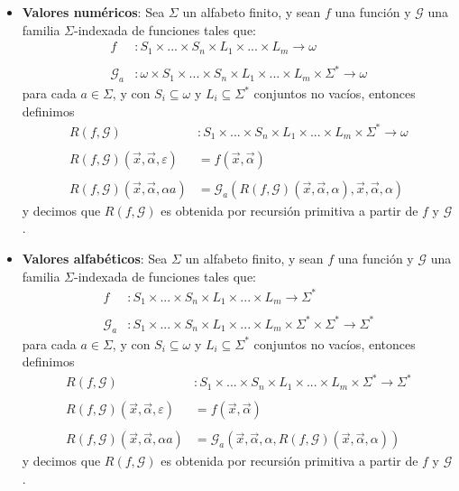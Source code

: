 \documentclass[
]{article}
\providecommand{\tightlist}{%
  \setlength{\itemsep}{0pt}\setlength{\parskip}{0pt}}
\begin{document}
\begin{enumerate}
  \begin{itemize}
  \tightlist
  \item
    \textbf{Valores numéricos}: Sea \(\Sigma\) un alfabeto finito, y
    sean \(f\) una función y \(\mathcal{G}\) una familia
    \(\Sigma\)-indexada de funciones tales que:
    \[\begin{aligned}f&:S_1\times ...\times S_n\times L_1\times ...\times L_m\to\omega\\ \\ \mathcal{G}_a&:\omega\times S_1\times ...\times S_n\times L_1\times ...\times L_m\times\Sigma^*\to\omega\end{aligned}\]
    para cada \(a\in\Sigma\), y con \(S_i\subseteq\omega\) y
    \(L_i\subseteq\Sigma^*\) conjuntos no vacíos, entonces definimos
    \[\begin{aligned} R(f,\mathcal{G})&:S_1\times ...\times S_n\times L_1\times ...\times L_m\times\Sigma^*\to\omega\\ \\ R(f,\mathcal{G})(\vec{x},\vec{\alpha},\varepsilon)&=f(\vec{x},\vec{\alpha})\\ \\ R(f,\mathcal{G})(\vec{x},\vec{\alpha},\alpha a)&=\mathcal{G}_a(R(f,\mathcal{G})(\vec{x},\vec{\alpha},\alpha),\vec{x},\vec{\alpha},\alpha) \end{aligned}\]
    y decimos que \(R(f,\mathcal{G})\) es obtenida por recursión
    primitiva a partir de \(f\) y \(\mathcal{G}\).
  \item
    \textbf{Valores alfabéticos}: Sea \(\Sigma\) un alfabeto finito, y
    sean \(f\) una función y \(\mathcal{G}\) una familia
    \(\Sigma\)-indexada de funciones tales que:
    \[\begin{aligned}f&:S_1\times ...\times S_n\times L_1\times ...\times L_m\to\Sigma^*\\ \\ \mathcal{G}_a&:S_1\times ...\times S_n\times L_1\times ...\times L_m\times\Sigma^*\times\Sigma^*\to\Sigma^*\end{aligned}\]
    para cada \(a\in\Sigma\), y con \(S_i\subseteq\omega\) y
    \(L_i\subseteq\Sigma^*\) conjuntos no vacíos, entonces definimos
    \[\begin{aligned} R(f,\mathcal{G})&:S_1\times ...\times S_n\times L_1\times ...\times L_m\times\Sigma^*\to\Sigma^*\\ \\ R(f,\mathcal{G})(\vec{x},\vec{\alpha},\varepsilon)&=f(\vec{x},\vec{\alpha})\\ \\ R(f,\mathcal{G})(\vec{x},\vec{\alpha},\alpha a)&=\mathcal{G}_a(\vec{x},\vec{\alpha},\alpha,R(f,\mathcal{G})(\vec{x},\vec{\alpha},\alpha)) \end{aligned}\]
    y decimos que \(R(f,\mathcal{G})\) es obtenida por recursión
    primitiva a partir de \(f\) y \(\mathcal{G}\).
  \end{itemize}
\end{enumerate}
\end{document}

